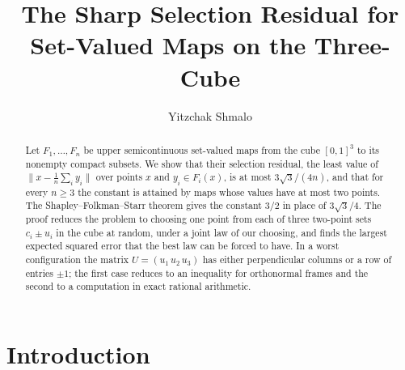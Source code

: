 \documentclass[11pt]{amsart}
\title[The selection residual on the three-cube]{The Sharp Selection Residual for Set-Valued Maps on the Three-Cube}
\author[Yitzchak Shmalo]{Yitzchak Shmalo}
\theoremstyle{remark}
\numberwithin{equation}{section}
\begin{document}
\begin{abstract}
Let $F_1,\dots,F_n$ be upper semicontinuous set-valued maps from the cube $[0,1]^3$ to its nonempty compact subsets. We show that their selection residual, the least value of $\|x-\frac1n\sum_i y_i\|$ over points $x$ and $y_i\in F_i(x)$, is at most $3\sqrt3/(4n)$, and that for every $n\ge3$ the constant is attained by maps whose values have at most two points. The Shapley--Folkman--Starr theorem gives the constant $3/2$ in place of $3\sqrt3/4$. The proof reduces the problem to choosing one point from each of three two-point sets $c_i\pm u_i$ in the cube at random, under a joint law of our choosing, and finds the largest expected squared error that the best law can be forced to have. In a worst configuration the matrix $U=(u_1\,u_2\,u_3)$ has either perpendicular columns or a row of entries $\pm1$; the first case reduces to an inequality for orthonormal frames and the second to a computation in exact rational arithmetic.
\end{abstract}

\maketitle

\section{Introduction}
\end{document}

